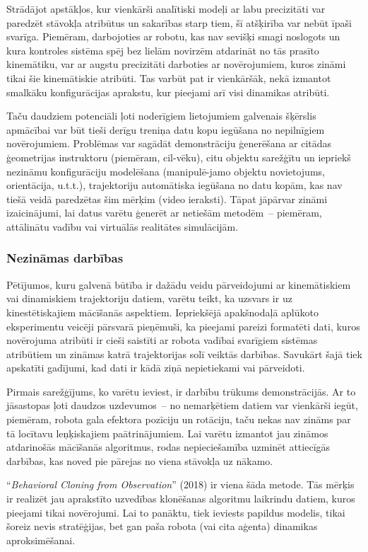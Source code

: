 \documentclass[12pt, a4paper]{article}
\numberwithin{equation}{section} %
\begin{document}
Strādājot apstākļos, kur vienkārši analītiski modeļi ar labu precizitāti var paredzēt stāvokļa atribūtus un sakarības starp tiem, šī atšķirība var nebūt īpaši svarīga. Piemēram, darbojoties ar robotu, kas nav sevišķi smagi noslogots un kura kontroles sistēma spēj bez lielām novirzēm atdarināt no tās prasīto kinemātiku, var ar augstu precizitāti darboties ar novērojumiem, kuros zināmi tikai šie kinemātiskie atribūti. Tas varbūt pat ir vienkāršāk, nekā izmantot smalkāku konfigurācijas aprakstu, kur pieejami arī visi dinamikas atribūti. 

Taču daudziem potenciāli ļoti noderīgiem lietojumiem galvenais šķērslis apmācībai var būt tieši derīgu treniņa datu kopu iegūšana no nepilnīgiem novērojumiem. Problēmas var sagādāt demonstrāciju ģenerēšana ar citādas ģeometrijas instruktoru (piemēram, cil-vēku), citu objektu sarežģītu un iepriekš nezināmu konfigurāciju modelēšana (manipulē-jamo objektu novietojums, orientācija, u.t.t.), trajektoriju automātiska iegūšana no datu kopām, kas nav tiešā veidā paredzētas šim mērķim (video ieraksti). Tāpat jāpārvar zināmi izaicinājumi, lai datus varētu ģenerēt ar netiešām metodēm~-- piemēram, attālinātu vadību vai virtuālās realitātes simulācijām.

\subsubsection{Nezināmas darbības}

Pētījumos, kuru galvenā būtība ir dažādu veidu pārveidojumi ar kinemātiskiem vai dinamiskiem trajektoriju datiem, varētu teikt, ka uzsvars ir uz kinestētiskajiem mācīšanās aspektiem. Iepriekšējā apakšnodaļā aplūkoto eksperimentu veicēji pārsvarā pieņēmuši, ka pieejami pareizi formatēti dati, kuros novērojuma atribūti ir cieši saistīti ar robota vadībai svarīgiem sistēmas atribūtiem un zināmas katrā trajektorijas solī veiktās darbības. Savukārt šajā tiek apskatīti gadījumi, kad dati ir kādā ziņā nepietiekami vai pārveidoti.

Pirmais sarežģījums, ko varētu ieviest, ir darbību trūkums demonstrācijās. Ar to jāsastopas ļoti daudzos uzdevumos~-- no nemarķētiem datiem var vienkārši iegūt, piemēram, robota gala efektora pozīciju un rotāciju, taču nekas nav zināms par tā locītavu leņķiskajiem paātrinājumiem. Lai varētu izmantot jau zināmos atdarinošās mācīšanās algoritmus, rodas nepieciešamība uzminēt attiecīgās darbības, kas noved pie pārejas no viena stāvokļa uz nākamo.

``\textit{Behavioral Cloning from Observation}'' \cite{torabi2018behavioral} (2018) ir viena šāda metode. Tās mērķis ir realizēt jau aprakstīto uzvedības klonēšanas algoritmu laikrindu datiem, kuros pieejami tikai novērojumi. Lai to panāktu, tiek ieviests papildus modelis, tikai šoreiz nevis stratēģijas, bet gan paša robota (vai cita aģenta) dinamikas aproksimēšanai.
\end{document}
